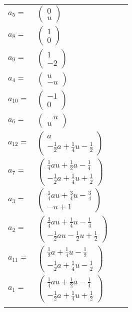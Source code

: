 \documentclass[1p]{elsarticle_modified}
\theoremstyle{definition}
\begin{document}
\begin{tabular}{m{7pt} m{180pt} m{7pt} m{180pt} }
\flushright $a_{5}=$&$\begin{pmatrix}0\\u\end{pmatrix}$ \\
\flushright $a_{8}=$&$\begin{pmatrix}1\\0\end{pmatrix}$ \\
\flushright $a_{9}=$&$\begin{pmatrix}1\\-2\end{pmatrix}$ \\
\flushright $a_{4}=$&$\begin{pmatrix}u\\- u\end{pmatrix}$ \\
\flushright $a_{10}=$&$\begin{pmatrix}-1\\0\end{pmatrix}$ \\
\flushright $a_{6}=$&$\begin{pmatrix}- u\\u\end{pmatrix}$ \\
\flushright $a_{12}=$&$\begin{pmatrix}a\\-\frac{1}{2} a+\frac{1}{4} u-\frac{1}{2}\end{pmatrix}$ \\
\flushright $a_{7}=$&$\begin{pmatrix}\frac{1}{4} a u+\frac{1}{2} a-\frac{1}{4}\\-\frac{1}{2} a+\frac{1}{4} u+\frac{1}{2}\end{pmatrix}$ \\
\flushright $a_{3}=$&$\begin{pmatrix}\frac{1}{4} a u+\frac{3}{4} u-\frac{3}{4}\\- u+1\end{pmatrix}$ \\
\flushright $a_{2}=$&$\begin{pmatrix}\frac{3}{4} a u+\frac{1}{4} u-\frac{1}{4}\\-\frac{1}{2} a u-\frac{1}{2} u+\frac{1}{2}\end{pmatrix}$ \\
\flushright $a_{11}=$&$\begin{pmatrix}\frac{1}{2} a+\frac{1}{4} u-\frac{1}{2}\\-\frac{1}{2} a+\frac{1}{4} u-\frac{1}{2}\end{pmatrix}$ \\
\flushright $a_{1}=$&$\begin{pmatrix}\frac{1}{4} a u+\frac{1}{2} a-\frac{1}{4}\\-\frac{1}{2} a+\frac{1}{4} u+\frac{1}{2}\end{pmatrix}$\\&\end{tabular}
\end{document}
